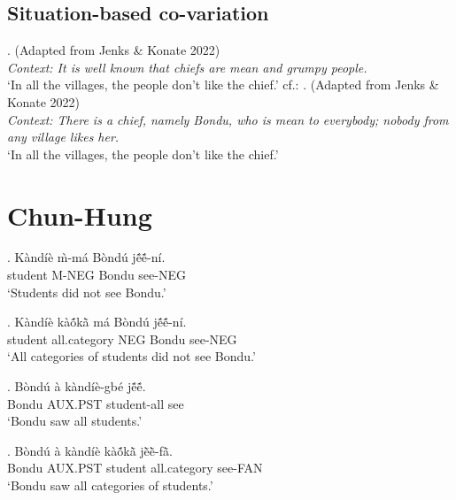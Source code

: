 \documentclass{assets/fieldnotes}
\begin{document}
\subsection{Situation-based co-variation}
   \ex. (Adapted from Jenks \& Konate 2022)\\
    \textit{Context: It is well known that chiefs are mean and grumpy people.}\\
    `In all the villages, the people don’t like the chief.'
    cf.:
    \ex. (Adapted from Jenks \& Konate 2022)\\
    \textit{Context: There is a chief, namely Bondu, who is mean to everybody; nobody from any village likes her.}\\
    `In all the villages, the people don’t like the chief.'
\section{Chun-Hung}


\exg. K\`{a}nd\'{i}\`{e} \`{m}-m\'{a} B\`{o}nd\'{u} jẽ́ẽ́-n\'{i}. \\
student M-NEG Bondu see-NEG \\
`Students did not see Bondu.'

\exg. K\`{a}nd\'{i}\`{e} k\`{a}ṍkã̀  m\'{a} B\`{o}nd\'{u} jẽ́ẽ́-n\'{i}. \\
student all.category NEG Bondu see-NEG \\
`All categories of students did not see Bondu.' 

\exg. B\`{o}nd\'{u} \`{a} k\`{a}nd\'{i}\`{e}-gb\'{e} jẽ́ẽ́. \\
Bondu AUX.PST student-all see \\
`Bondu saw all students.'

\exg. B\`{o}nd\'{u} \`{a} k\`{a}nd\'{i}\`{e} k\`{a}ṍkã̀  jẽ̀ẽ̀-fã̀. \\
Bondu AUX.PST student all.category see-FAN \\
`Bondu saw all categories of students.'


 \newline
\end{document}
